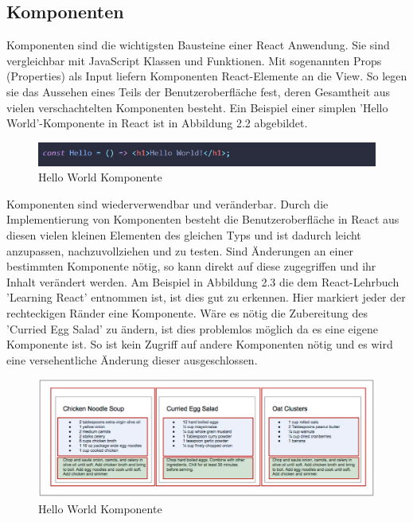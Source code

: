 \subsection{Komponenten}
Komponenten sind die wichtigsten Bausteine einer React Anwendung. Sie sind vergleichbar mit JavaScript Klassen und Funktionen. Mit sogenannten Props (Properties) als Input liefern Komponenten React-Elemente an die View. So legen sie das Aussehen eines Teils der Benutzeroberfläche fest, deren Gesamtheit aus vielen verschachtelten Komponenten besteht. Ein Beispiel einer simplen 'Hello World'-Komponente in React ist in Abbildung 2.2 abgebildet.
\begin{figure}[H]
     \centerline{\includegraphics[width=12cm]{../Abbildungen/compHello.png}}
  \caption{Hello World Komponente \cite{eig}}
  \label{Hello World Komponente}
\end{figure}
Komponenten sind wiederverwendbar und veränderbar. Durch die Implementierung von Komponenten besteht die Benutzeroberfläche in React aus diesen vielen kleinen Elementen des gleichen Typs und ist dadurch leicht anzupassen, nachzuvollziehen und zu testen. Sind Änderungen an einer bestimmten Komponente nötig, so kann direkt auf diese zugegriffen und ihr Inhalt verändert werden. Am Beispiel in Abbildung 2.3 die dem React-Lehrbuch 'Learning React' entnommen ist, ist dies gut zu erkennen. Hier markiert jeder der rechteckigen Ränder eine Komponente. Wäre es nötig die Zubereitung des 'Curried Egg Salad' zu ändern, ist dies problemlos möglich da es eine eigene Komponente ist. So ist kein Zugriff auf andere Komponenten nötig und es wird eine versehentliche Änderung dieser ausgeschlossen.\\
\begin{figure}[H]
     \centerline{\includegraphics[width=12cm]{../Abbildungen/compContainer.png}}
  \caption{Hello World Komponente \cite{6}}
  \label{Hello World Komponente}
\end{figure}
\clearpage
